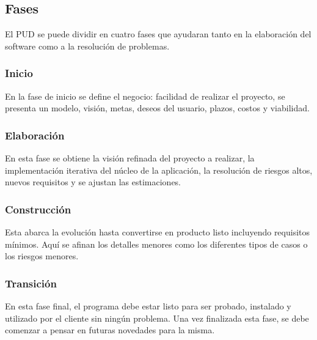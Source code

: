 \subsection{Fases}

El PUD se puede dividir en cuatro fases que ayudaran tanto en la elaboración del software como a la resolución de problemas.

\subsubsection{Inicio}

En la fase de inicio se define el negocio: facilidad de realizar el proyecto, se presenta un modelo, visión, metas, deseos del usuario, plazos, costos y viabilidad.

\subsubsection{Elaboración}

En esta fase se obtiene la visión refinada del proyecto a realizar, la implementación iterativa del núcleo de la aplicación, la resolución de riesgos altos, nuevos requisitos y se ajustan las estimaciones.

\subsubsection{Construcción}

Esta abarca la evolución hasta convertirse en producto listo incluyendo requisitos mínimos. Aquí se afinan los detalles menores como los diferentes tipos de casos o los riesgos menores.

\subsubsection{Transición}

En esta fase final, el programa debe estar listo para ser probado, instalado y utilizado por el cliente sin ningún problema. Una vez finalizada esta fase, se debe comenzar a pensar en futuras novedades para la misma.
